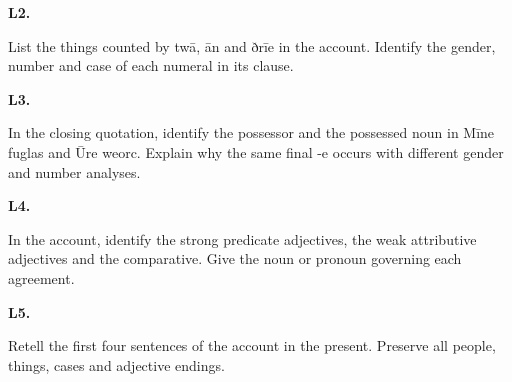 \par\begin{minipage}{\linewidth}\raggedright
\textbf{L2.}

List the things counted by twā, ān and ðrīe in the account. Identify the gender, number and case of each numeral in its clause.

\end{minipage}\par\addvspace{4pt}

\par\begin{minipage}{\linewidth}\raggedright
\textbf{L3.}

In the closing quotation, identify the possessor and the possessed noun in Mīne fuglas and Ūre weorc. Explain why the same final -e occurs with different gender and number analyses.

\end{minipage}\par\addvspace{4pt}

\par\begin{minipage}{\linewidth}\raggedright
\textbf{L4.}

In the account, identify the strong predicate adjectives, the weak attributive adjectives and the comparative. Give the noun or pronoun governing each agreement.

\end{minipage}\par\addvspace{4pt}

\par\begin{minipage}{\linewidth}\raggedright
\textbf{L5.}

Retell the first four sentences of the account in the present. Preserve all people, things, cases and adjective endings.

\end{minipage}\par\addvspace{4pt}

